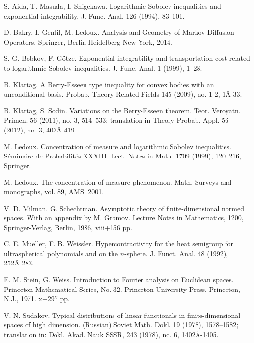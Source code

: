 \documentclass[reqno,12pt]{amsart}
\theoremstyle{plain}
\begin{document}
\vskip10mm
\begin{thebibliography}{BH3}
\itemsep=-0pt
\small
\vskip2mm 
S. Aida, T. Masuda, I. Shigekawa. Logarithmic Sobolev inequalities
         and exponential integrability. J. Func. Anal. 126 (1994),
         83--101.

\vskip2mm 
D. Bakry, I. Gentil, M. Ledoux. Analysis and Geometry of Markov Diffusion
        Operators. Springer, Berlin Heidelberg New York, 2014.
   
\vskip2mm 
S. G. Bobkov, F. G\"otze. Exponential integrability and transportation
         cost related to logarithmic Sobolev inequalities.
         J. Func. Anal. 1 (1999), 1--28.

\vskip2mm 
B. Klartag. A Berry-Esseen type inequality for convex bodies with an 
         unconditional basis. Probab. Theory Related Fields  145  (2009),  
         no. 1-2, 1Â-33. 

\vskip2mm 
B. Klartag, S. Sodin. Variations on the Berry-Esseen theorem.  
         Teor. Veroyatn. Primen.  56  (2011),  no. 3, 514--533;  
         translation in  Theory Probab. Appl.  56  (2012),  no. 3, 403Â-419.

\vskip2mm 
M. Ledoux. Concentration of measure and logarithmic Sobolev inequalities.
         S\'eminaire de Probabilit\'es XXXIII. Lect. Notes in Math.
         1709 (1999), 120--216, Springer.

\vskip2mm 
M. Ledoux. The concentration of measure phenomenon. Math. Surveys and
         monographs, vol. 89, AMS, 2001.

\vskip2mm
V. D. Milman, G. Schechtman. Asymptotic theory of finite-dimensional normed 
         spaces. With an appendix by M. Gromov. Lecture Notes in Mathematics, 
         1200, Springer-Verlag, Berlin, 1986, viii+156 pp. 

\vskip2mm
C. E. Mueller, F. B. Weissler. Hypercontractivity for the heat semigroup 
         for ultraspherical polynomials and on the $n$-sphere. 
         J. Funct. Anal. 48 (1992), 252Â-283.

\vskip2mm
E. M. Stein, G. Weiss. Introduction to Fourier analysis on Euclidean spaces. 
         Princeton Mathematical Series, No. 32. Princeton University Press, 
         Princeton, N.J., 1971. x+297 pp. 

\vskip2mm
V. N. Sudakov. Typical distributions of linear functionals in 
         finite-dimensional spaces of high dimension. (Russian) 
         Soviet Math. Dokl. 19 (1978), 1578--1582;
         translation in: 
         Dokl. Akad. Nauk SSSR, 243 (1978), no. 6, 1402Â-1405.        


\end{thebibliography}
\end{document}
